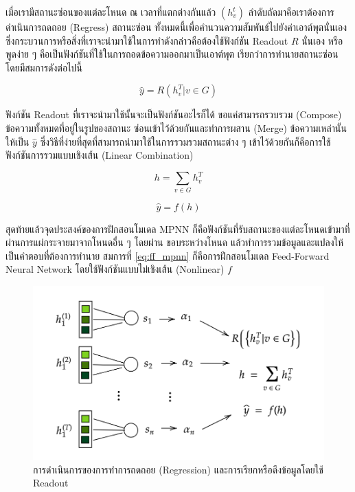 เมื่อเรามีสถานะซ่อนของแต่ละโหนด ณ เวลาที่แตกต่างกันแล้ว $(h^{t}_{v})$ ลำดับถัดมาคือเราต้องการดำเนินการถดถอย (Regress) สถานะซ่อน%
ทั้งหมดนี้เพื่อคำนวนความสัมพันธ์ไปยังค่าเอาต์พุตนั่นเอง ซึ่งกระบวนการหรือสิ่งที่เราจะนำมาใช้ในการทำดังกล่าวคือต้องใช้ฟังก์ชัน Readout $R$ นั่นเอง
หรือพูดง่าย ๆ คือเป็นฟังก์ชันที่ใช้ในการถอดข้อความออกมาเป็นเอาต์พุต เรียกว่าการทำนายสถานะซ่อน โดยมีสมการดังต่อไปนี้

\begin{equation}
    \hat{y} = R({h^{T}_{v} | v \in G})
\end{equation}

\noindent ฟังก์ชัน Readout ที่เราจะนำมาใช้นั้นจะเป็นฟังก์ชันอะไรก็ได้ ขอแค่สามารถรวบรวม (Compose) ข้อความทั้งหมดที่อยู่ในรูปของสถานะ%
ซ่อนเข้าไว้ด้วยกันและทำการผสาน (Merge) ข้อความเหล่านั้นให้เป็น $\hat{y}$ ซึ่งวิธีที่ง่ายที่สุดที่สามารถนำมาใช้ในการรวมรวมสถานะต่าง ๆ 
เข้าไว้ด้วยกันก็คือการใช้ฟังก์ชันการรวมแบบเชิงเส้น (Linear Combination)

\begin{equation}
    h = \sum_{v \in G} h^{T}_{v}
\end{equation}

\begin{equation}\label{eq:ff_mpnn}
    \hat{y} = f(h)
\end{equation}

สุดท้ายแล้วจุดประสงค์ของการฝึกสอนโมเดล MPNN ก็คือฟังก์ชันที่รับสถานะของแต่ละโหนดเข้ามาที่ผ่านการแผ่กระจายมาจากโหนดอื่น ๆ โดยผ่าน%
ขอบระหว่างโหนด แล้วทำการรวมข้อมูลและแปลงให้เป็นคำตอบที่ต้องการทำนาย สมการที่ \ref{eq:ff_mpnn} ก็คือการฝึกสอนโมเดล 
Feed-Forward Neural Network โดยใช้ฟังก์ชันแบบไม่เชิงเส้น (Nonlinear) $f$

\begin{figure}[htbp]
    \centering
    \includegraphics[width=0.9\linewidth]{fig/mp-operation.png}
    \caption{การดำเนินการของการทำการถดถอย (Regression) และการเรียกหรือดึงข้อมูลโดยใช้ Readout}
    \label{fig:mp_operation}
\end{figure}

